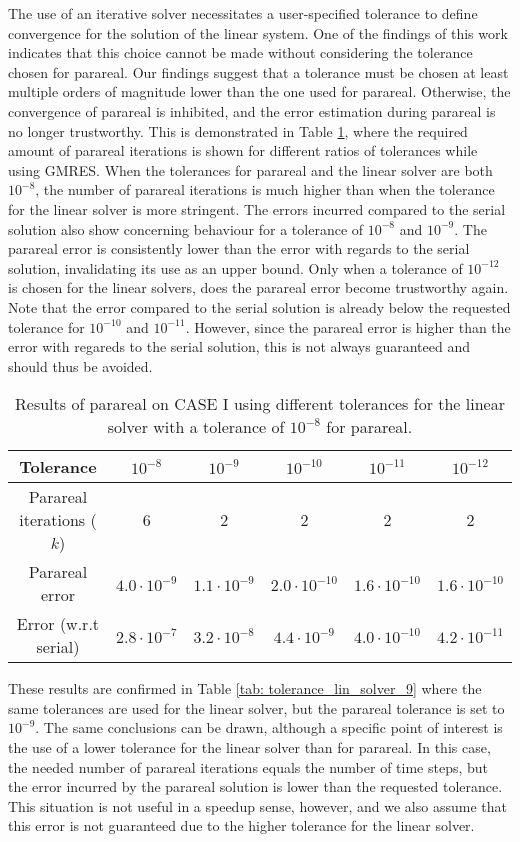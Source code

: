 The use of an iterative solver necessitates a user-specified tolerance to define convergence for the solution of the linear system. One of the findings of this work indicates that this choice cannot be made without considering the tolerance chosen for parareal. Our findings suggest that a tolerance must be chosen at least multiple orders of magnitude lower than the one used for parareal. Otherwise, the convergence of parareal is inhibited, and the error estimation during parareal is no longer trustworthy. This is demonstrated in Table \ref{tab: tolerance_lin_solver_8}, where the required amount of parareal iterations is shown for different ratios of tolerances while using GMRES. When the tolerances for parareal and the linear solver are both $10^{-8}$, the number of parareal iterations is much higher than when the tolerance for the linear solver is more stringent. The errors incurred compared to the serial solution also show concerning behaviour for a tolerance of $10^{-8}$ and $10^{-9}$. The parareal error is consistently lower than the error with regards to the serial solution, invalidating its use as an upper bound. Only when a tolerance of $10^{-12}$ is chosen for the linear solvers, does the parareal error become trustworthy again. Note that the error compared to the serial solution is already below the requested tolerance for $10^{-10}$ and $10^{-11}$. However, since the parareal error is higher than the error with regareds to the serial solution, this is not always guaranteed and should thus be avoided.
\begin{table}[htbp]
    \centering
    \begin{tabular}{|c|c|c|c|c|c|}
        \hline
        \textbf{Tolerance}& $10^{-8}$ & $10^{-9}$ & $10^{-10}$ & $10^{-11}$& $10^{-12}$\\
        \hline
         Parareal iterations ($k$)& 6 & 2 & 2 & 2 & 2\\
         Parareal error & $4.0\cdot10^{-9}$ & $1.1\cdot10^{-9}$ & $2.0\cdot10^{-10}$ & $1.6\cdot10^{-10}$ & $1.6\cdot 10^{-10}$\\
         Error (w.r.t serial) & $2.8\cdot10^{-7}$ & $3.2\cdot10^{-8}$ & $4.4\cdot10^{-9}$ & $4.0\cdot10^{-10}$& $4.2\cdot 10^{-11}$\\
        \hline
    \end{tabular}
    \caption{Results of parareal on CASE I using different tolerances for the linear solver with a tolerance of $10^{-8}$ for parareal.}
    \label{tab: tolerance_lin_solver_8}
\end{table}
These results are confirmed in Table \ref{tab: tolerance_lin_solver_9} where the same tolerances are used for the linear solver, but the parareal tolerance is set to $10^{-9}$. The same conclusions can be drawn, although a specific point of interest is the use of a lower tolerance for the linear solver than for parareal. In this case, the needed number of parareal iterations equals the number of time steps, but the error incurred by the parareal solution is lower than the requested tolerance. This situation is not useful in a speedup sense, however, and we also assume that this error is not guaranteed due to the higher tolerance for the linear solver.
